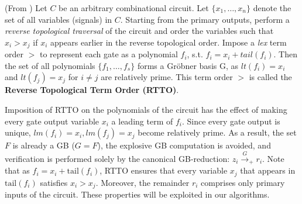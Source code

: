 \begin{Proposition} \label{prop:top-order}
(From \cite{lv:tcad2013}) Let $C$ be an arbitrary combinational
  circuit. Let $\{x_1, \dots, x_n\}$ denote the set of all variables
  (signals) in $C$. Starting from the primary outputs, perform
  a {\it reverse topological traversal} of the circuit and order the
  variables such that $x_i > x_j$ if $x_i$ appears earlier in the
  reverse topological order. Impose a {\it lex} term order $>$ to
  represent each gate as a polynomial $f_i$, s.t. $f_i = x_i +
  tail(f_i)$. Then the set of all polynomials  $\{f_1, \dots, f_s\}$
  forms a Gr\"obner basis G, as $lt(f_i)=x_i$ and $lt(f_j)=x_j$ for
  $i\neq j$ are relatively prime. This term order $>$ is called the 
  {\bf Reverse Topological Term Order (RTTO)}.
\end{Proposition}

Imposition of RTTO on the polynomials of the circuit has the effect of
making every gate output variable $x_i$ a leading term of
$f_i$. Since every gate output is unique, $lm(f_i)=x_i, lm(f_j)=x_j$
become relatively prime. As a result, the set $F$ is already a GB
($G=F$), the explosive GB computation is avoided, and verification is
performed solely by the canonical GB-reduction: $z_i \xrightarrow{G}_+r_i$. 
Note that as $f_i = x_i + \text{tail}(f_i)$, RTTO ensures that
every variable $x_j$ that appears in $\text{tail}(f_i)$ satisfies
$x_i>x_j$. Moreover, the remainder $r_i$ comprises only primary inputs
of the circuit. These properties will be exploited in our algorithms.

